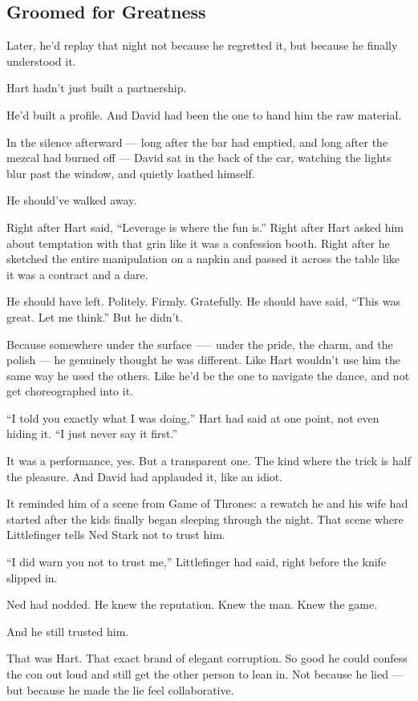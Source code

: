 \subsection{Groomed for Greatness}

Later, he’d replay that night not because he regretted it, but because he finally understood it.

Hart hadn’t just built a partnership.

He’d built a profile.
And David had been the one to hand him the raw material.

In the silence afterward --- long after the bar had emptied, and long after the mezcal had burned off --- David 
sat in the back of the car, watching the lights blur past the window, and quietly loathed himself.

He should’ve walked away.

Right after Hart said, ``Leverage is where the fun is.''
Right after Hart asked him about temptation with that grin like it was a confession booth.
Right after he sketched the entire manipulation on a napkin and passed it across the table like it was 
a contract and a dare.

He should have left. Politely. Firmly. Gratefully.
He should have said, ``This was great. Let me think.''
But he didn’t.

Because somewhere under the surface --— under the pride, the charm, and the polish --- he genuinely thought 
he was different.
Like Hart wouldn’t use him the same way he used the others.
Like he’d be the one to navigate the dance, and not get choreographed into it.

``I told you exactly what I was doing,'' Hart had said at one point, not even hiding it.
``I just never say it first.''

It was a performance, yes. But a transparent one. The kind where the trick is half the pleasure.
And David had applauded it, like an idiot.

It reminded him of a scene from Game of Thrones: a rewatch he and his wife had started after the kids 
finally began sleeping through the night.
That scene where Littlefinger tells Ned Stark not to trust him.

``I did warn you not to trust me,'' Littlefinger had said, right before the knife slipped in.

Ned had nodded. He knew the reputation. Knew the man. Knew the game.

And he still trusted him.

That was Hart. That exact brand of elegant corruption.
So good he could confess the con out loud and still get the other person to lean in.
Not because he lied — but because he made the lie feel collaborative.

